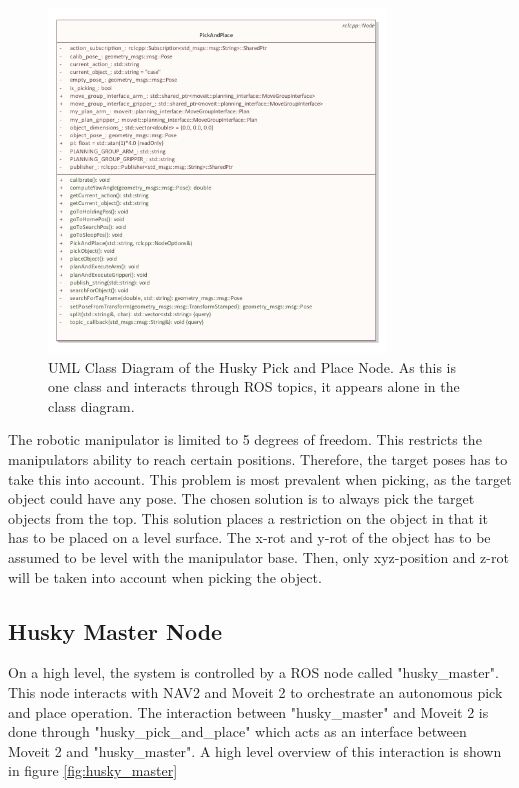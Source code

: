 \begin{figure}[htp]
  \centering
  \includegraphics[width = 0.8\textwidth]{Figures/husky_pick_and_place.pdf}
  \caption{UML Class Diagram of the Husky Pick and Place Node. As this is one class and interacts through ROS topics, it appears alone in the class diagram.}
  \label{fig:PickAndPlaceUML}
\end{figure}

The robotic manipulator is limited to 5 degrees of freedom. This restricts the manipulators ability to reach certain positions. Therefore, the target poses has to take this into account. This problem is most prevalent when picking, as the target object could have any pose.
The chosen solution is to always pick the target objects from the top. This solution places a restriction on the object in that it has to be placed on a level surface. The x-rot and y-rot of the object has to be assumed to be level with the manipulator base. Then, only xyz-position and z-rot  will be taken into account when picking the object.


\subsection{Husky Master Node} \label{sec:M:A:HuskyMasterNode}
On a high level, the system is controlled by a ROS node called "husky\_master". This node interacts with NAV2 and Moveit 2 to orchestrate an autonomous pick and place operation. The interaction between "husky\_master" and Moveit 2 is done through "husky\_pick\_and\_place" which acts as an interface between Moveit 2 and "husky\_master". A high level overview of this interaction is shown in figure \ref{fig:husky_master}

